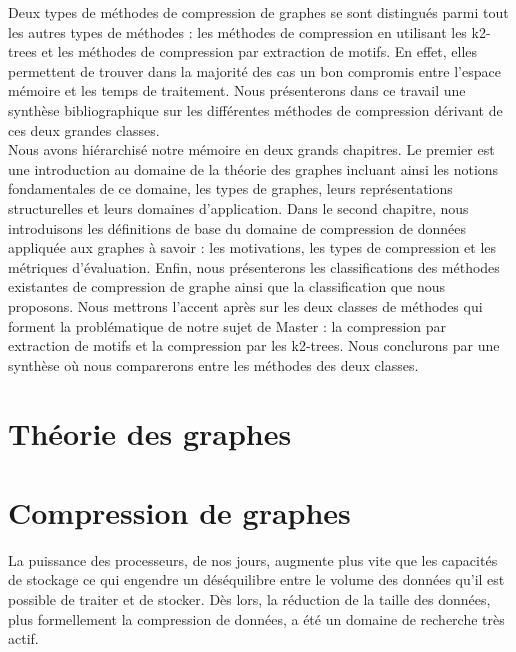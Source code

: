 \documentclass[a4paper,oneside,12pt]{report}
\renewcommand{\headrulewidth}{0pt} %
\renewcommand{\headrulewidth}{0pt}%
\renewcommand{\headrulewidth}{0.4pt}
\theoremstyle{definition}
\begin{document}
Deux types de méthodes de compression de graphes se sont distingués parmi tout les autres types de méthodes : les méthodes de compression en utilisant les k2-trees et les méthodes de compression par extraction de motifs. En effet, elles permettent de trouver dans la majorité des cas un bon compromis entre l'espace mémoire et les temps de traitement. Nous présenterons dans ce travail une synthèse bibliographique sur les différentes méthodes de compression dérivant de ces deux grandes classes.	\\
		
			
			 Nous avons hiérarchisé notre mémoire en deux grands chapitres. Le premier est une introduction au domaine de la théorie des graphes incluant ainsi les notions fondamentales de ce domaine, les types de graphes, leurs représentations structurelles et leurs domaines d'application. Dans le second chapitre, nous introduisons les définitions de base du domaine de compression de données appliquée aux graphes à savoir : les motivations, les types de compression et les métriques d'évaluation. Enfin, nous présenterons les classifications des méthodes existantes de compression de graphe ainsi que la classification que nous proposons. Nous mettrons l'accent après sur les deux classes de méthodes qui forment la problématique de notre sujet de Master : la compression par extraction de motifs et la compression par les k2-trees. Nous conclurons par une synthèse où nous comparerons entre les méthodes des deux classes.
	
\pagestyle{fancy}
\fancypagestyle{plain}{%
  \fancyhf{}%
  \renewcommand{\headrulewidth}{0pt}%
  \fancyhf[lef,rof]{\thepage}%
}
\renewcommand{\headrulewidth}{0.4pt}
\fancyhead[R]{\rightmark}


	\chapter{ Théorie des graphes}
	  
	

	\chapter{Compression de graphes}
	La puissance des processeurs, de nos jours, augmente plus vite que les capacités de stockage ce qui engendre un déséquilibre entre le volume des données qu’il est possible de
traiter et de stocker. Dès lors, la réduction de la taille des données, plus formellement la compression de données, a été un domaine de recherche très actif. 
		
\end{document}
